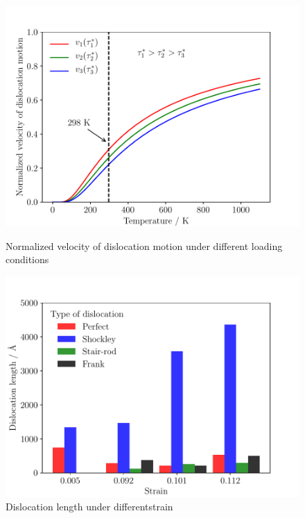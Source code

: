 \documentclass[Unknown,article,submit,moreauthors,pdftex,10pt,a4paper]{Definitions/mdpi}
\begin{document}
\begin{figure}[ht]
	\centering
	\begin{minipage}{0.495\textwidth}
		\includegraphics[width=1\linewidth]{img/temp}
		\centering
		\caption{Normalized velocity of dislocation motion under different loading conditions}
		\label{fig:temp}
	\end{minipage}	
	\hfill
	\begin{minipage}{0.495\textwidth}		
		\includegraphics[width=1\linewidth]{img/dis-summary}
		\centering
		\caption{Dislocation length under differentstrain }
		\label{fig:disum}
	\end{minipage}
\end{figure}
\end{document}
